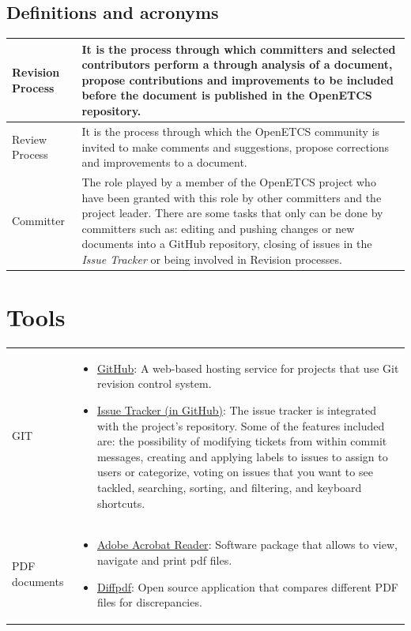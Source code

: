 \documentclass{template/openetcs_article}
\begin{document}
\subsection{Definitions and acronyms}
\tablehead{}
\tabletail{}
\tablelasttail{}
\begin{supertabular}{|m{3cm}m{11cm}|}
\hline
Revision Process &
It is the process through which committers and selected contributors perform a through analysis of a document, propose contributions and improvements to be included before the document is published in the OpenETCS repository.
\\\hline
Review Process &
It is the process through which the OpenETCS community is invited to make comments and suggestions, propose corrections and improvements to a document.
\\\hline
Committer &
The role played by a member of the OpenETCS project who have been granted with this role by other committers and the project leader. There are some tasks that only can be done by committers such as: editing and pushing changes or new documents into a GitHub repository, closing of issues in the {\it Issue Tracker} or being involved in Revision processes.
\\\hline
\end{supertabular}

\section{Tools}

\begin{flushleft}

\begin{tabular}{|m{3cm}|m{11cm}|}
\hline
\rowcolor{myblue}
\multicolumn{2}{|c|}{Tools} \\\hline
GIT &
\begin{itemize}
\item \underline{GitHub}: A web-based hosting service for projects that use Git revision control system.
\item \underline{Issue Tracker (in GitHub)}: The issue tracker is integrated with the project's repository. Some of the features included are: the possibility of modifying tickets from within commit messages,
creating and applying labels to issues to assign to users or categorize, voting on issues that you want to see tackled, searching, sorting, and filtering, and keyboard shortcuts.
\end{itemize}
\\\hline
PDF documents &
\begin{itemize}
\item \underline{Adobe Acrobat Reader}: Software package that allows to view, navigate and print pdf files.
\item \underline{Diffpdf}: Open source application that compares different PDF files for discrepancies. 
\end{itemize}
\\\hline
\end{tabular}
\end{flushleft}
\end{document}
